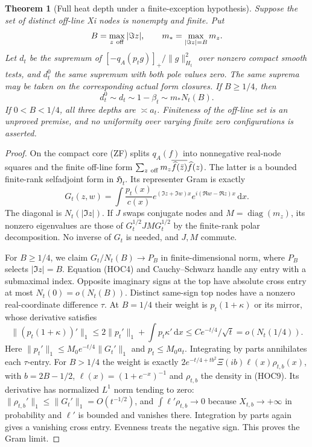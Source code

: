 \documentclass[11pt]{article}
\newtheorem{theorem}{Theorem}
\theoremstyle{remark}\newtheorem{remark}[theorem]{Remark}
\newcommand{\dd}{\,\mathrm d}
\begin{document}
\begin{theorem}[Full heat depth under a finite-exception hypothesis]
\label{thm:finite-off-heat-depth}
Suppose the set of distinct off-line Xi nodes is nonempty and finite.
Put
\[
 B=\max_{z\ {\rm off}}|\Im z|,\qquad
 m_* =\max_{|\Im z|=B}m_z .
\]
Let $d_t$ be the supremum of
$[-q_A(p_tg)]_+/\|g\|_{H_t}^2$ over nonzero compact smooth tests,
and $d_t^0$ the same supremum with both pole values zero.
The same suprema may be taken on the corresponding actual form
closures. If $B\ge1/4$, then
\[
 d_t^0\sim d_t\sim 1-\beta_t\sim m_*N_t(B).                  \tag{HFD1}
\]
If $0<B<1/4$, all three depths are $\asymp a_t$.
Finiteness of the off-line set is an unproved premise, and no
uniformity over varying finite zero configurations is asserted.
\end{theorem}
\begin{proof}
On the compact core (ZF) splits $q_A(f)$ into nonnegative real-node
squares and the finite off-line form
$\sum_{z\ {\rm off}}m_z\overline{\widehat f(\bar z)}\widehat f(z)$.
The latter is a bounded finite-rank selfadjoint form in $\mathfrak H_t$.
Its representer Gram is exactly
\[
 G_t(z,w)=\int\frac{p_t(x)}{c(x)}
          e^{(\Im z+\Im w)x}e^{i(\Re w-\Re z)x}\dd x.          \tag{HFD2}
\]
The diagonal is $N_t(|\Im z|)$. If $J$ swaps conjugate nodes and
$M=\operatorname{diag}(m_z)$, its nonzero eigenvalues are those of
$G_t^{1/2}JM G_t^{1/2}$ by the finite-rank polar decomposition.
No inverse of $G_t$ is needed, and $J,M$ commute.

For $B\ge1/4$, we claim $G_t/N_t(B)\to P_B$ in finite-dimensional
norm, where $P_B$ selects $|\Im z|=B$.
Equation (HOC4) and Cauchy--Schwarz handle any entry with a submaximal
index. Opposite imaginary signs at the top have absolute cross entry
at most $N_t(0)=o(N_t(B))$. Distinct same-sign top nodes have a
nonzero real-coordinate difference $\tau$. At $B=1/4$ their weight
is $p_t(1+\kappa)$ or its mirror, whose derivative satisfies
\[
 \|(p_t(1+\kappa))'\|_1
 \le2\|p_t'\|_1+\int p_t\kappa'\dd x
 \le Ce^{-t/4}/\sqrt t=o(N_t(1/4)).                          \tag{HFD3}
\]
Here $\|p_t'\|_1\le M_0e^{-t/4}\|G_t'\|_1$ and
$p_t\le M_0a_t$. Integrating by parts annihilates each $\tau$-entry.
For $B>1/4$ the weight is exactly
$2e^{-t/4+tb^2}\Xi(ib)\ell(x)\rho_{t,b}(x)$, with $b=2B-1/2$,
$\ell(x)=(1+e^{-x})^{-1}$ and $\rho_{t,b}$ the density in (HOC9).
Its derivative has normalized $L^1$ norm tending to zero:
$\|\rho_{t,b}'\|_1\le\|G_t'\|_1=O(t^{-1/2})$, and
$\int\ell'\rho_{t,b}\to0$ because $X_{t,b}\to+\infty$ in
probability and $\ell'$ is bounded and vanishes there.
Integration by parts again gives a vanishing cross entry.
Evenness treats the negative sign. This proves the Gram limit.


\end{proof}
\end{document}
